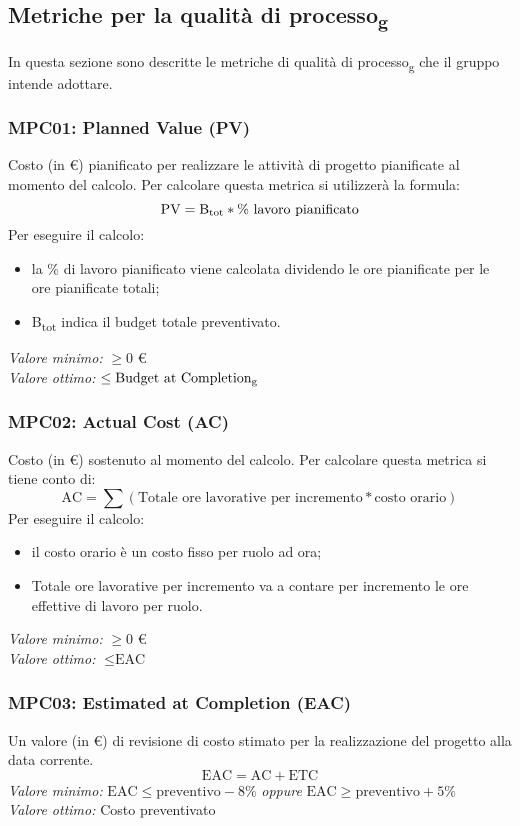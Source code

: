 \subsection{Metriche per la qualità di processo\textsubscript{g}}
In questa sezione sono descritte le metriche di qualità di processo\textsubscript{g} che il gruppo intende adottare.

\subsubsection{MPC01: Planned Value (PV)}
Costo (in \euro) pianificato per realizzare le attività di progetto pianificate al momento del calcolo.
Per calcolare questa metrica si utilizzerà la formula:
\begin{equation*}
\text{PV}=\text{B}\textsubscript{tot} * \%\text{ lavoro pianificato}
\end{equation*}
\noindent Per eseguire il calcolo:
\begin{itemize}
\item la \% di lavoro pianificato viene calcolata dividendo le ore pianificate per le ore pianificate totali;
\item B\textsubscript{tot} indica il budget totale preventivato.
\end{itemize}
\textit{Valore minimo:} $\ge 0$ \euro\\
\textit{Valore ottimo:}	$\le \text{Budget at Completion\textsubscript{g}}$
\subsubsection{MPC02: Actual Cost (AC)}
Costo (in \euro) sostenuto al momento del calcolo.
Per calcolare questa metrica si tiene conto di:
\begin{equation*}
\text{AC}=\sum (\text{Totale ore lavorative per incremento}*\text{costo orario})
\end{equation*}
\noindent Per eseguire il calcolo:
\begin{itemize}
\item il costo orario è un costo fisso per ruolo ad ora;
\item Totale ore lavorative per incremento va a contare per incremento le ore effettive di lavoro per ruolo.
\end{itemize}
\textit{Valore minimo:} $\ge 0$ \euro\\
\textit{Valore ottimo:} $\le \text{EAC}$
\subsubsection{MPC03: Estimated at Completion (EAC)}
Un valore (in \euro) di revisione di costo stimato per la realizzazione del progetto alla data corrente.
\begin{equation*}
\text{EAC}=\text{AC}+\text{ETC}
\end{equation*}
\textit{Valore minimo:} 
$ \text{EAC} \le \text{preventivo} -8\% $ \textit{oppure} $ \text{EAC} \ge \text{preventivo} +5\% $\\
\textit{Valore ottimo:} Costo preventivato
